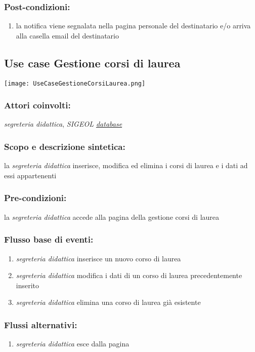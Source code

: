 \documentclass[11pt,a4paper]{article}
\begin{document}
\subsubsection*{Post-condizioni:}
\begin{enumerate}
 \item la notifica viene segnalata nella pagina personale del destinatario e/o arriva alla casella email del destinatario
\end{enumerate}
\subsection{Use case Gestione corsi di laurea}
\begin{center} 
 \texttt{[image: UseCaseGestioneCorsiLaurea.png]}
\end{center}
\subsubsection*{Attori coinvolti:}
\textit{segreteria didattica}, \textit{SIGEOL \underline{database}}
\subsubsection*{Scopo e descrizione sintetica:}
la \textit{segreteria didattica} inserisce, modifica ed elimina i corsi di laurea e i dati ad essi appartenenti
\subsubsection*{Pre-condizioni:}
la \textit{segreteria didattica} accede alla pagina della gestione corsi di laurea
\subsubsection*{Flusso base di eventi:}
\begin{enumerate}
 \item \textit{segreteria didattica} inserisce un nuovo corso di laurea
 \item \textit{segreteria didattica} modifica i dati di un corso di laurea precedentemente inserito
 \item \textit{segreteria didattica} elimina una corso di laurea già esistente
\end{enumerate}
\subsubsection*{Flussi alternativi:}
\begin{enumerate} 
\item \textit{segreteria didattica} esce dalla pagina
\end{enumerate}
\end{document}
